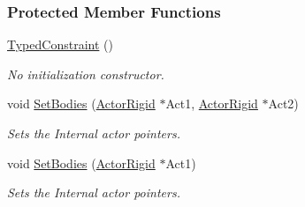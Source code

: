\subsubsection*{Protected Member Functions}
\begin{DoxyCompactItemize}
\item 
\hyperlink{classMezzanine_1_1TypedConstraint_a850beae54095af9ac2da27050955a338}{TypedConstraint} ()
\begin{DoxyCompactList}\small\item\em No initialization constructor. \item\end{DoxyCompactList}\item 
\hypertarget{classMezzanine_1_1TypedConstraint_a82175a88ddca2fe0f7063b7869a1f363}{
void \hyperlink{classMezzanine_1_1TypedConstraint_a82175a88ddca2fe0f7063b7869a1f363}{SetBodies} (\hyperlink{classMezzanine_1_1ActorRigid}{ActorRigid} $\ast$Act1, \hyperlink{classMezzanine_1_1ActorRigid}{ActorRigid} $\ast$Act2)}
\label{classMezzanine_1_1TypedConstraint_a82175a88ddca2fe0f7063b7869a1f363}

\begin{DoxyCompactList}\small\item\em Sets the Internal actor pointers. \item\end{DoxyCompactList}\item 
\hypertarget{classMezzanine_1_1TypedConstraint_a678957e08faf3ded0b81cf4219ce5e77}{
void \hyperlink{classMezzanine_1_1TypedConstraint_a678957e08faf3ded0b81cf4219ce5e77}{SetBodies} (\hyperlink{classMezzanine_1_1ActorRigid}{ActorRigid} $\ast$Act1)}
\label{classMezzanine_1_1TypedConstraint_a678957e08faf3ded0b81cf4219ce5e77}

\begin{DoxyCompactList}\small\item\em Sets the Internal actor pointers. \item\end{DoxyCompactList}\end{DoxyCompactItemize}
